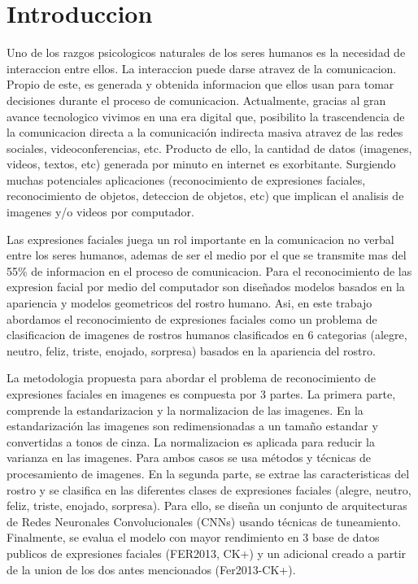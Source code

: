 \chapter*{Introduccion}
Uno de los razgos psicologicos naturales de los seres humanos es la necesidad de interaccion entre ellos. La interaccion puede darse atravez de la comunicacion. Propio de este, es generada y obtenida informacion que ellos usan para tomar decisiones durante el proceso de comunicacion. Actualmente, gracias al gran avance tecnologico vivimos en una era digital que, posibilito la trascendencia de la comunicacion directa a la comunicación indirecta masiva atravez de las redes sociales, videoconferencias, etc. Producto de ello, la cantidad de datos (imagenes, videos, textos, etc) generada por minuto en internet es exorbitante. Surgiendo muchas potenciales aplicaciones (reconocimiento de expresiones faciales, reconocimiento de objetos, deteccion de objetos, etc) que implican el analisis de imagenes y/o videos por computador. 

Las expresiones faciales juega un rol importante en la comunicacion no verbal entre los seres humanos, ademas de ser el medio por el que se transmite mas del 55\% de informacion en el proceso  de comunicacion. Para el reconocimiento de las expresion facial por medio del computador son diseñados modelos basados en la apariencia y modelos geometricos del rostro humano.
Asi, en este trabajo abordamos el reconocimiento de expresiones faciales como un problema de clasificacion de imagenes de rostros humanos clasificados en 6 categorias (alegre, neutro, feliz, triste, enojado, sorpresa) basados en la apariencia del rostro.

La metodologia propuesta  para abordar el problema de reconocimiento de expresiones faciales en imagenes es compuesta por 3 partes. La primera parte, comprende la estandarizacion y la normalizacion de las imagenes. En la estandarización las imagenes son redimensionadas a un tamaño estandar y convertidas a tonos de cinza. La normalizacion es aplicada para reducir la varianza en las imagenes. Para ambos casos se usa métodos y técnicas de procesamiento de imagenes. En la segunda parte, se extrae las caracteristicas del rostro y se clasifica en las diferentes clases de expresiones faciales (alegre, neutro, feliz, triste, enojado, sorpresa). Para ello, se diseña un conjunto de arquitecturas de Redes Neuronales Convolucionales (CNNs) usando técnicas de tuneamiento. Finalmente, se evalua el modelo con mayor rendimiento en 3 base de datos publicos de expresiones faciales (FER2013, CK+) y un adicional creado a partir de la union de los dos antes mencionados (Fer2013-CK+). 

